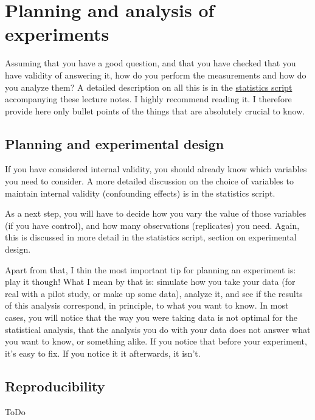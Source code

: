 \documentclass{tufte-book}
\begin{document}
\section{Planning and analysis of experiments} 

Assuming that you have a good question, and that you have checked that you have validity of answering it, how do you perform the measurements and how do you analyze them? A detailed description on all this is in the \href{https://github.com/florianhartig/ResearchSkills/raw/master/Labs/Statistics/Script/EssentialStatistics.pdf}{statistics script} accompanying these lecture notes. I highly recommend reading it. I therefore provide here only bullet points of the things that are absolutely crucial to know. 


\subsection{Planning and experimental design}

If you have considered internal validity, you should already know which variables you need to consider. A more detailed discussion on the choice of variables to maintain internal validity (confounding effects) is in the statistics script. 

As a next step, you will have to decide how you vary the value of those variables (if you have control), and how many observations (replicates) you need. Again, this is discussed in more detail in the statistics script, section on experimental design.

Apart from that, I thin the most important tip for planning an experiment is: play it though! What I mean by that is: simulate how you take your data (for real with a pilot study, or make up some data), analyze it, and see if the results of this analysis correspond, in principle, to what you want to know. In most cases, you will notice that the way you were taking data is not optimal for the statistical analysis, that the analysis you do with your data does not answer what you want to know, or something alike. If you notice that before your experiment, it's easy to fix. If you notice it it afterwards, it isn't. 


\subsection{Reproducibility}

ToDo
\end{document}
